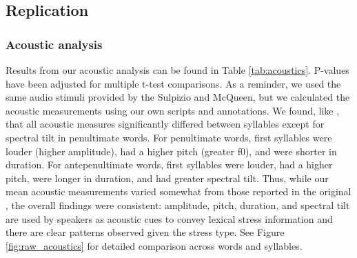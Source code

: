 \subsection{Replication}

\subsubsection{Acoustic analysis}
Results from our acoustic analysis can be found in Table \ref{tab:acoustics}. P-values have been adjusted for multiple t-test comparisons. As a reminder, we used the same audio stimuli provided by the Sulpizio and McQueen, but we calculated the acoustic measurements using our own scripts and annotations. We found, like \cite{Sulpizio_McQueen_2012}, that all acoustic measures significantly differed between syllables except for spectral tilt in penultimate words. For penultimate words, first syllables were louder (higher amplitude), had a higher pitch (greater f0), and were shorter in duration. For antepenultimate words, first syllables were louder, had a higher pitch, were longer in duration, and had greater spectral tilt. Thus, while our mean acoustic measurements varied somewhat from those reported in the original \cite{Sulpizio_McQueen_2012}, the overall findings were consistent: amplitude, pitch, duration, and spectral tilt are used by speakers as acoustic cues to convey lexical stress information and there are clear patterns observed given the stress type. See Figure \ref{fig:raw_acoustics} for detailed comparison across words and syllables. 

